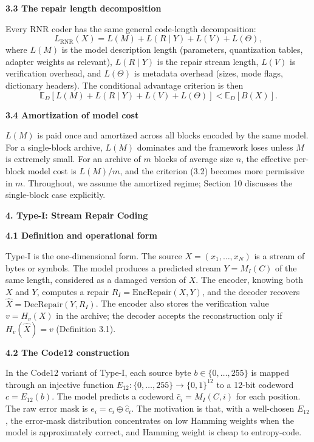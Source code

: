 \documentclass[
]{article}
\begin{document}
\textbf{3.3 The repair length decomposition}

Every RNR coder has the same general code-length decomposition:
\[
L_{\text{RNR}}(X) = L(M) + L(R \mid Y) + L(V) + L(\Theta),
\tag{3.1}
\]
where $L(M)$ is the model description length (parameters,
quantization tables, adapter weights as relevant), $L(R \mid Y)$ is
the repair stream length, $L(V)$ is verification overhead, and
$L(\Theta)$ is metadata overhead (sizes, mode flags, dictionary
headers). The conditional advantage criterion is then
\[
\mathbb{E}_D\!\left[L(M) + L(R \mid Y) + L(V) + L(\Theta)\right] < \mathbb{E}_D[B(X)].
\tag{3.2}
\]

\textbf{3.4 Amortization of model cost}

$L(M)$ is paid once and amortized across all blocks encoded by the
same model. For a single-block archive, $L(M)$ dominates and the
framework loses unless $M$ is extremely small. For an archive of $m$
blocks of average size $n$, the effective per-block model cost is
$L(M)/m$, and the criterion (3.2) becomes more permissive in $m$.
Throughout, we assume the amortized regime; Section 10 discusses the
single-block case explicitly.

\textbf{4. Type-I: Stream Repair Coding}

\textbf{4.1 Definition and operational form}

Type-I is the one-dimensional form. The source
$X = (x_1, \ldots, x_N)$ is a stream of bytes or symbols. The model
produces a predicted stream $Y = M_I(C)$ of the same length,
considered as a damaged version of $X$. The encoder, knowing both
$X$ and $Y$, computes a repair $R_I = \mathrm{EncRepair}(X, Y)$, and
the decoder recovers $\hat{X} = \mathrm{DecRepair}(Y, R_I)$. The
encoder also stores the verification value $v = H_v(X)$ in the
archive; the decoder accepts the reconstruction only if
$H_v(\hat{X}) = v$ (Definition 3.1).

\textbf{4.2 The Code12 construction}

In the Code12 variant of Type-I, each source byte
$b \in \{0, \ldots, 255\}$ is mapped through an injective function
$E_{12} : \{0, \ldots, 255\} \to \{0,1\}^{12}$ to a 12-bit codeword
$c = E_{12}(b)$. The model predicts a codeword $\hat{c}_i = M_I(C, i)$
for each position. The raw error mask is
$e_i = c_i \oplus \hat{c}_i$. The motivation is that, with a
well-chosen $E_{12}$, the error-mask distribution concentrates on
low Hamming weights when the model is approximately correct, and
Hamming weight is cheap to entropy-code.
\end{document}
